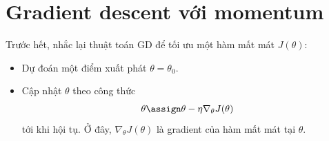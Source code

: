  




\newpage
\section{Gradient descent với momentum}
 
 
 
Trước hết, nhắc lại thuật toán GD để tối ưu một hàm mất mát $J(\theta)$:
\begin{itemize}
    \item  Dự đoán một điểm xuất phát $\theta = \theta_0$. 
    \item  Cập nhật $\theta$ theo công thức
\begin{equation} 
\theta \assign \theta - \eta \nabla_{\theta}J(\theta) 
\end{equation}
tới khi hội tụ. Ở đây, $\nabla_{\theta}J(\theta)$ là gradient của hàm mất mát tại $\theta$. 
\end{itemize}
 
